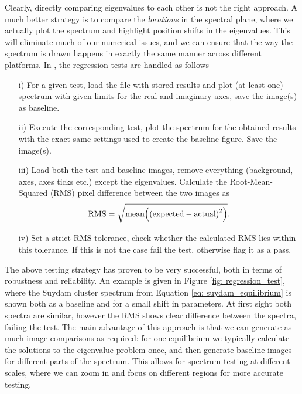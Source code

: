 Clearly, directly comparing eigenvalues to each other is not the right approach. A much better strategy is to compare the \emph{locations} in the spectral plane, where we actually plot the spectrum and highlight position shifts in the eigenvalues. This will eliminate much of our numerical issues, and we can ensure that the way the spectrum is drawn happens in exactly the same manner across different platforms. In {\legolas}, the regression tests are handled as follows
\begin{enumerate}
  \item[i)] For a given test, load the file with stored results and plot (at least one) spectrum with given limits for the real and imaginary axes, save the image(s) as baseline.
  \item[ii)] Execute the corresponding test, plot the spectrum for the obtained results with the exact same settings used to create the baseline figure. Save the image(s).
  \item[iii)] Load both the test and baseline images, remove everything (background, axes, axes ticks etc.) except the eigenvalues. Calculate the Root-Mean-Squared (RMS) pixel difference between the two images as
  \begin{equation}
    \text{RMS} = \sqrt{\text{mean}\Bigl(\left(\text{expected} - \text{actual}\right)^2\Bigr)}.
  \end{equation}
  \item[iv)] Set a strict RMS tolerance, check whether the calculated RMS lies within this tolerance. If this is not the case fail the test, otherwise flag it as a pass.
\end{enumerate}
The above testing strategy has proven to be very successful, both in terms of robustness and reliability. An example is given in Figure \ref{fig: regression_test}, where the Suydam cluster spectrum from Equation \eqref{eq: suydam_equilibrium} is shown both as a baseline and for a small shift in parameters. At first sight both spectra are similar, however the RMS shows clear difference between the spectra, failing the test. The main advantage of this approach is that we can generate as much image comparisons as required: for one equilibrium we typically calculate the solutions to the eigenvalue problem once, and then generate baseline images for different parts of the spectrum. This allows for spectrum testing at different scales, where we can zoom in and focus on different regions for more accurate testing.

